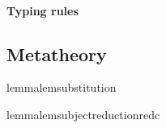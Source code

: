 \documentclass[main.tex]{subfiles}
\begin{document}

\paragraph{Typing rules}%
\label{sec:lvar-typing}

% 
% 

\subsection{Metatheory}

\begin{restatable}[Substitution]{lemma}{lemsubstitution}
  \label{lem:substitution}
\end{restatable}

\begin{restatable}{lemma}{lemsubjectreductionredc}
  \label{lem:subject-reduction-redc}
\end{restatable}
\end{document}
